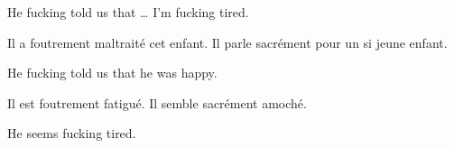 \documentclass[a4paper,10pt]{article}
\begin{document}
\begin{exe}
  \ex\label{adjv} He fucking told us that \ldots
  \ex\label{adja} I'm fucking tired.
\end{exe}

\begin{exe}
\ex
  \begin{xlist}
    \ex Il a foutrement maltraité cet enfant.
    \ex Il parle sacrément pour un si jeune enfant.
  \end{xlist}
\ex He fucking told us that he was happy.
\ex
  \begin{xlist}
    \ex Il est foutrement fatigué.
    \ex Il semble sacrément amoché.
  \end{xlist}
\ex He seems fucking tired.
\end{exe}

\vspace{2cm}
\end{document}
